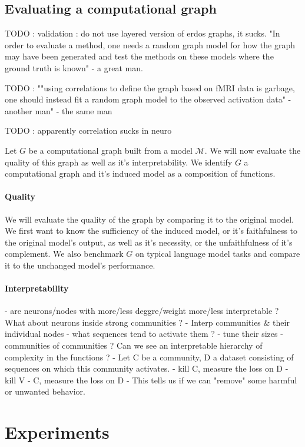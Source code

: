 \documentclass{article}
\begin{document}
\subsection{Evaluating a computational graph}

TODO : validation : do not use layered version of erdos graphs, it sucks. "In order to evaluate a method, one needs a random graph model for how the graph may have been generated and test the methods on these models where the ground truth is known" - a great man.

TODO : ""using correlations to define the graph based on fMRI data is garbage, one should instead fit a random graph model to the observed activation data" - another man" - the same man

TODO : apparently correlation sucks in neuro

Let $G$ be a computational graph built from a model $\mathcal{M}$. We will now evaluate the quality of this graph as well as it's interpretability. We identify $G$ a computational graph and it's induced model as a composition of functions.

\paragraph{Quality} We will evaluate the quality of the graph by comparing it to the original model. We first want to know the sufficiency of the induced model, or it's faithfulness to the original model's output, as well as it's necessity, or the unfaithfulness of it's complement. We also benchmark $G$ on typical language model tasks and compare it to the unchanged model's performance.

\paragraph{Interpretability}

- are neurons/nodes with more/less deggre/weight more/less interpretable ? What about neurons inside strong communities ?
- Interp communities & their individual nodes
    - what sequences tend to activate them ?
    - tune their sizes
    - communities of communities ? Can we see an interpretable hierarchy of complexity in the functions ?
- Let C be a community, D a dataset consisting of sequences on which this community activates.
    - kill C, measure the loss on D
    - kill V - C, measure the loss on D
    - This tells us if we can "remove" some harmful or unwanted behavior.

\section{Experiments}
\end{document}
